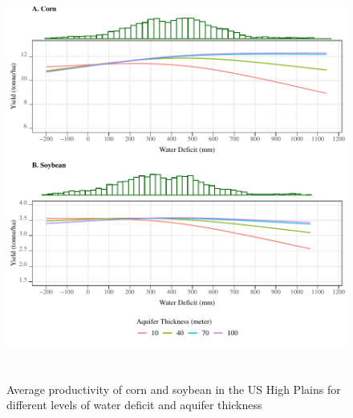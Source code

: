 \documentclass[
]{article}
\begin{document}
\begin{figure}[H]

{\centering \includegraphics[width=6in,height=500px,]{Figures/g_total_impact} 

}

\caption{Average productivity of corn and soybean in the US High Plains for different levels of water deficit and aquifer thickness}\label{fig:tot-impact}
\end{figure}
\end{document}

